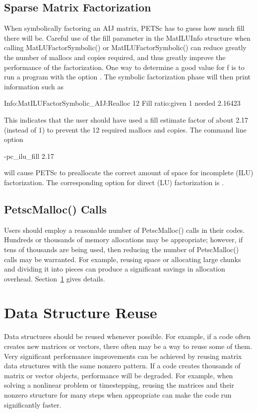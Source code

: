 {{\subsection{Sparse Matrix Factorization}
\label{sec_symbolfactor}

When symbolically factoring an AIJ matrix, PETSc has to guess
how much fill there will be.  Careful use of the fill parameter in the 
MatILUInfo structure  
when calling MatLUFactorSymbolic() or MatILUFactorSymbolic()
can reduce greatly the number of mallocs and copies required, and thus
greatly improve the performance of the factorization.  One way to
determine a good value for f is to run a program with the option .
The symbolic factorization phase will then print information such as
\begin{tabbing}
   Info:MatILUFactorSymbolic\_AIJ:Realloc 12 Fill ratio:given 1 needed 2.16423
\end{tabbing}
This indicates that the user should have used a fill estimate factor of
about 2.17 (instead of 1) to prevent the 12 required mallocs and copies.
The command line option   
\begin{tabbing}
    -pc\_ilu\_fill 2.17
\end{tabbing}
will cause PETSc to preallocate the correct amount of space for incomplete
(ILU) factorization.  The corresponding option for direct (LU) factorization
is  .

\subsection{PetscMalloc() Calls}
Users should employ a reasonable number of PetscMalloc() calls in their codes.
Hundreds or thousands of memory allocations may be appropriate; however, if tens of 
thousands are being used, then reducing the number of PetscMalloc() calls
may be warranted.  For example, reusing space or allocating large chunks 
and dividing it into pieces can produce a significant savings in 
allocation overhead.  Section~\ref{sec_dsreuse} gives details.

\section{Data Structure Reuse}
\label{sec_dsreuse}

Data structures should be reused whenever possible.  For example, if a code often
creates new matrices or vectors, there often may be a way to reuse some
of them.  Very significant performance improvements can be achieved by
reusing matrix data structures with the same nonzero pattern.  If a code
creates thousands of matrix or vector objects, performance will be
degraded.  For example, when solving a nonlinear problem or timestepping,
reusing the matrices and their nonzero structure for many steps when
 appropriate can make the code run significantly faster.  

}}
